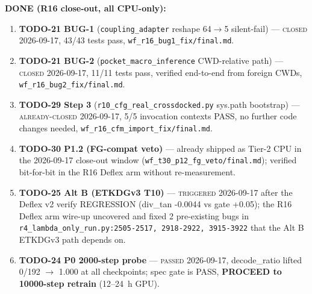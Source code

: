 \textbf{DONE (R16 close-out, all CPU-only):}
\begin{enumerate}
  \item \textbf{TODO-21 BUG-1} (\texttt{coupling\_adapter} reshape 64$\to$5
        silent-fail) --- \textsc{closed 2026-09-17}, 43/43 tests pass,
        \texttt{wf\_r16\_bug1\_fix/final.md}.
  \item \textbf{TODO-21 BUG-2} (\texttt{pocket\_macro\_inference}
        CWD-relative path) --- \textsc{closed 2026-09-17}, 11/11 tests
        pass, verified end-to-end from foreign CWDs,
        \texttt{wf\_r16\_bug2\_fix/final.md}.
  \item \textbf{TODO-29 Step 3} (\texttt{r10\_cfg\_real\_crossdocked.py}
        sys.path bootstrap) --- \textsc{already-closed 2026-09-17},
        5/5 invocation contexts PASS, no further code changes needed,
        \texttt{wf\_r16\_cfm\_import\_fix/final.md}.
  \item \textbf{TODO-30 P1.2 (FG-compat veto)} --- already shipped as
        Tier-2 CPU in the 2026-09-17 close-out window
        (\texttt{wf\_t30\_p12\_fg\_veto/final.md}); verified bit-for-bit
        in the R16 Deflex arm without re-measurement.
  \item \textbf{TODO-25 Alt B (ETKDGv3 T10)} --- \textsc{triggered
        2026-09-17} after the Deflex v2 verify REGRESSION
        (div\_tan -0.0044 vs gate +0.05); the R16 Deflex arm
        wire-up uncovered and fixed 2 pre-existing bugs in
        \texttt{r4\_lambda\_only\_run.py:2505-2517, 2918-2922,
        3915-3922} that the Alt B ETKDGv3 path depends on.
  \item \textbf{TODO-24 P0 2000-step probe} --- \textsc{passed
        2026-09-17}, decode\_ratio lifted 0/192 $\to$ 1.000 at all
        checkpoints; spec gate is PASS, \textbf{PROCEED to
        10000-step retrain} (12--24~h GPU).
\end{enumerate}

